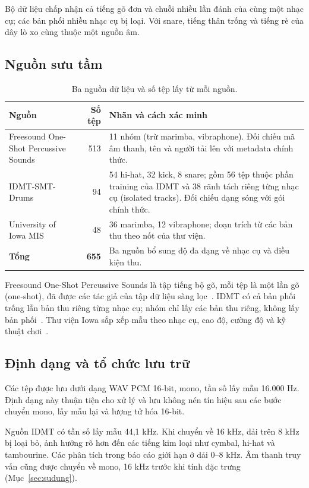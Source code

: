 \documentclass[11pt,a4paper]{article}
\begin{document}
Bộ dữ liệu chấp nhận cả tiếng gõ đơn và chuỗi nhiều lần đánh của cùng một nhạc cụ; các bản phối nhiều nhạc cụ bị loại. Với snare, tiếng thân trống và tiếng rè của dây lò xo cùng thuộc một nguồn âm.

\subsection{Nguồn sưu tầm}
\begin{table}[htbp]
\centering\small
\caption{Ba nguồn dữ liệu và số tệp lấy từ mỗi nguồn.}\label{tab:nguon}
\begin{tabularx}{\textwidth}{p{}rX}
\toprule
Nguồn & Số tệp & Nhãn và cách xác minh\\\midrule
Freesound One-Shot Percussive Sounds~\cite{freesound} & 513 & 11 nhóm (trừ marimba, vibraphone). Đối chiếu mã âm thanh, tên và người tải lên với metadata chính thức.\\
IDMT-SMT-Drums~\cite{idmt} & 94 & 54 hi-hat, 32 kick, 8 snare; gồm 56 tệp thuộc phần training của IDMT và 38 rãnh tách riêng từng nhạc cụ (isolated tracks). Đối chiếu dạng sóng với gói chính thức.\\
University of Iowa MIS~\cite{iowa} & 48 & 36 marimba, 12 vibraphone; đoạn trích từ các bản thu theo nốt của thư viện.\\\midrule
\textbf{Tổng} & \textbf{655} & Ba nguồn bổ sung độ đa dạng về nhạc cụ và điều kiện thu.\\\bottomrule
\end{tabularx}
\end{table}
Freesound One-Shot Percussive Sounds là tập tiếng bộ gõ, mỗi tệp là một lần gõ (one-shot), đã được các tác giả của tập dữ liệu sàng lọc~\cite{freesound}. IDMT có cả bản phối trống lẫn bản thu riêng từng nhạc cụ; nhóm chỉ lấy các bản thu riêng, không lấy bản phối~\cite{idmt}. Thư viện Iowa sắp xếp mẫu theo nhạc cụ, cao độ, cường độ và kỹ thuật chơi~\cite{iowa}.

\subsection{Định dạng và tổ chức lưu trữ}\label{sec:dinhdang}
Các tệp được lưu dưới dạng WAV PCM 16-bit, mono, tần số lấy mẫu 16.000 Hz. Định dạng này thuận tiện cho xử lý và lưu không nén tín hiệu sau các bước chuyển mono, lấy mẫu lại và lượng tử hóa 16-bit.

Nguồn IDMT có tần số lấy mẫu 44,1 kHz. Khi chuyển về 16 kHz, dải trên 8 kHz bị loại bỏ, ảnh hưởng rõ hơn đến các tiếng kim loại như cymbal, hi-hat và tambourine. Các phân tích trong báo cáo giới hạn ở dải 0--8 kHz. Âm thanh truy vấn cũng được chuyển về mono, 16 kHz trước khi tính đặc trưng (Mục~\ref{sec:sudung}).
\end{document}
